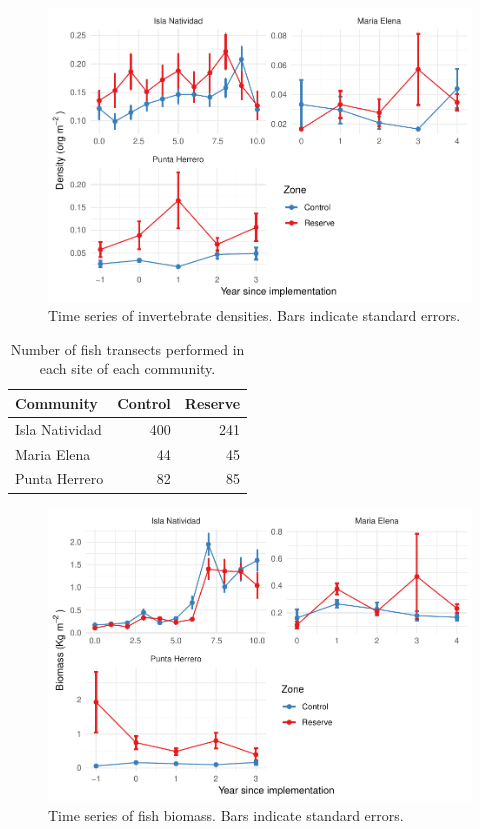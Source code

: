 \documentclass[utf8]{frontiers_suppmat} %
\begin{document}
\begin{figure}
\centering
\includegraphics{SupplementaryMaterial_files/figure-latex/unnamed-chunk-4-1.pdf}
\caption{\label{fig:unnamed-chunk-4}Time series of invertebrate densities. Bars indicate standard errors.}
\end{figure}

\clearpage

\begin{table}[t]

\caption{\label{tab:unnamed-chunk-5}Number of fish transects performed in each site of each community.}
\centering
\begin{tabular}{lrr}
\toprule
Community & Control & Reserve\\
\midrule
Isla Natividad & 400 & 241\\
Maria Elena & 44 & 45\\
Punta Herrero & 82 & 85\\
\bottomrule
\end{tabular}
\end{table}

\begin{figure}
\centering
\includegraphics{SupplementaryMaterial_files/figure-latex/unnamed-chunk-6-1.pdf}
\caption{\label{fig:unnamed-chunk-6}Time series of fish biomass. Bars indicate standard errors.}
\end{figure}
\end{document}
